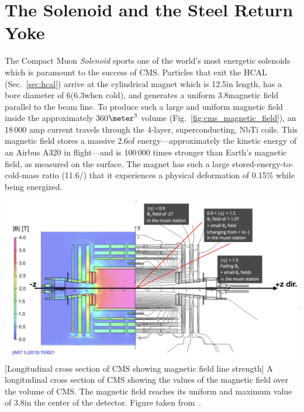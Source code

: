\section{The Solenoid and the Steel Return Yoke}
\label{sec:solenoid}

The Compact Muon \emph{Solenoid} sports one of the world's most energetic solenoids which is paramount to the success of CMS.
Particles that exit the HCAL (Sec.~\ref{sec:hcal}) arrive at the cylindrical magnet which is 12.5\meter in length, has a bore diameter of 6\meter (6.3\meter when cold), and generates a uniform 3.8\tesla magnetic field parallel to the beam line.
To produce such a large and uniform magnetic field inside the approximately 360$\meter^3$ volume (Fig.~\ref{fig:cms_magnetic_field}), an 18\,000 amp current travels through the 4-layer, superconducting, NbTi coils.
This magnetic field stores a massive 2.6\GJ of energy---approximately the kinetic energy of an Airbus A320 in flight---and is 100\,000 times stronger than Earth's magnetic field, as measured on the surface.
The magnet has such a large stored-energy-to-cold-mass ratio (11.6\KJ/\Kgns) that it experiences a physical deformation of 0.15\% while being energized.
\begin{multiFigure}
    \centering
    \includegraphics[width=\textwidth]{figures/cms/solenoid/CMS_longitudinal_view_magnetic_field.png}
        [Longitudinal cross section of CMS showing magnetic field line strength]
        {A longitudinal cross section of CMS showing the values of the magnetic field over the volume of CMS. 
        The magnetic field reaches its uniform and maximum value of 3.8\tesla in the center of the detector.
        Figure taken from~\cite{PhysRevLett.114.191803}. %
        }
    \label{fig:cms_magnetic_field}
\end{multiFigure}

